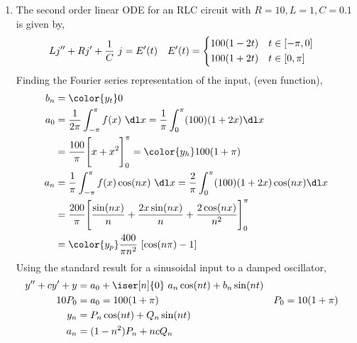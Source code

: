 \begin{enumerate}
    \item The second order linear ODE for an RLC circuit with $ R = 10, L = 1, C = 0.1 $
          is given by,
          \begin{align}
              Lj'' + Rj' + \frac{1}{C}\ j & = E'(t)                          &
              E'(t)                       & = \begin{dcases}
                                                  100(1-2t)   & t \in [-\pi, 0] \\
                                                  100(1 + 2t) & t \in [0, \pi]  \\
                                              \end{dcases}
          \end{align}
          Finding the Fourier series representation of the input, (even function),
          \begin{align}
              b_n & = \color{y_t} 0                                         \\
              a_0 & = \frac{1}{2\pi} \int_{-\pi}^{\pi} f(x)\ \dl x
              = \frac{1}{\pi} \int_{0}^{\pi} (100)(1 + 2x) \dl x            \\
                  & = \frac{100}{\pi}\Bigg[ x + x^2 \Bigg]_{0}^{\pi}
              = \color{y_h} 100(1 + \pi)                                    \\
              a_n & = \frac{1}{\pi} \int_{-\pi}^{\pi} f(x) \cos(nx)\ \dl x
              = \frac{2}{\pi} \int_{0}^{\pi} (100)(1 + 2x) \cos(nx) \dl x   \\
                  & = \frac{200}{\pi}\Bigg[ \frac{\sin(nx)}{n} +
              \frac{2x\sin(nx)}{n} + \frac{2\cos(nx)}{n^2} \Bigg]_{0}^{\pi} \\
                  & = \color{y_p} \frac{400}{\pi n^2}\ [\cos(n\pi) - 1]
          \end{align}
          Using the standard result for a sinusoidal input to a damped oscillator,
          \begin{align}
              y'' + cy' + y & = a_0 + \iser[n]{0}\ a_n \cos(nt) + b_n \sin(nt)   \\
              10P_0         & = a_0 = 100(1 + \pi)                             &
              P_0           & = 10(1 + \pi)                                      \\
              y_n           & = P_n \cos(nt) + Q_n\sin(nt)                       \\
              a_n           & = (1 - n^2)P_n + nc Q_n                          &

\end{align}
\end{enumerate}
